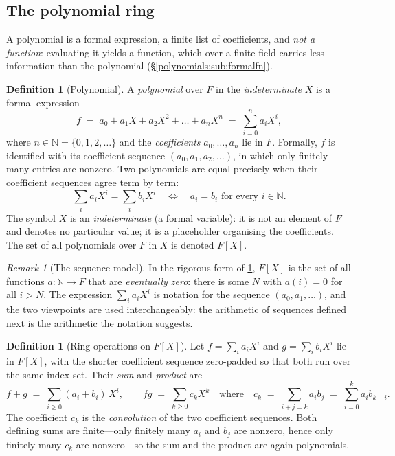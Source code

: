 \documentclass[11pt,a4paper]{article}
\theoremstyle{definition}
\newtheorem{definition}[theorem]{Definition}
\theoremstyle{remark}
\newtheorem{remark}[theorem]{Remark}
\newcommand{\N}{\ensuremath{\mathbb{N}}}
\begin{document}
\subsection{The polynomial ring}\label{polynomials:sub:ring}

A polynomial is a formal expression, a finite list of coefficients, and
\emph{not a function}: evaluating it yields a function, which over a
finite field carries less information than the polynomial
(\S\ref{polynomials:sub:formalfn}).

\begin{definition}[Polynomial]\label{polynomials:def:polynomial}
A \emph{polynomial} over \(F\) in the \emph{indeterminate} \(X\) is a
formal expression
\[
f \;=\; a_0 + a_1 X + a_2 X^2 + \dots + a_n X^n \;=\; \sum_{i=0}^{n} a_i X^i,
\]
where \(n \in \N = \{0,1,2,\dots\}\) and the \emph{coefficients}
\(a_0,\dots,a_n\) lie in \(F\). Formally, \(f\) is identified with its
coefficient sequence \((a_0,a_1,a_2,\dots)\), in which only finitely many
entries are nonzero. Two polynomials are equal precisely when their
coefficient sequences agree term by term:
\[
\sum_i a_i X^i = \sum_i b_i X^i
\quad\Longleftrightarrow\quad
a_i = b_i \text{ for every } i \in \N .
\]
The symbol \(X\) is an \emph{indeterminate} (a formal variable): it is not
an element of \(F\) and denotes no particular value; it is a
placeholder organising the coefficients. The set of all polynomials over
\(F\) in \(X\) is denoted \(F[X]\).
\end{definition}

\begin{remark}[The sequence model]\label{polynomials:rem:sequence-model}
In the rigorous form of \cref{polynomials:def:polynomial}, \(F[X]\) is
the set of all functions \(a\colon \N \to F\) that are \emph{eventually
zero}: there is some \(N\) with \(a(i) = 0\) for all \(i > N\). The
expression \(\sum_i a_i X^i\) is notation for the sequence
\((a_0,a_1,\dots)\), and the two viewpoints are used interchangeably: the
arithmetic of sequences defined next is the arithmetic the notation
suggests.
\end{remark}

\begin{definition}[{Ring operations on \(F[X]\)}]
\label{polynomials:def:operations}
Let \(f = \sum_i a_i X^i\) and \(g = \sum_i b_i X^i\) lie in \(F[X]\),
with the shorter coefficient sequence zero-padded so that both run over
the same index set. Their \emph{sum} and \emph{product} are
\[
f + g \;=\; \sum_{i \ge 0} (a_i + b_i)\, X^i,
\qquad
f g \;=\; \sum_{k \ge 0} c_k X^k
\quad\text{where}\quad
c_k \;=\; \sum_{i+j=k} a_i b_j \;=\; \sum_{i=0}^{k} a_i b_{k-i} .
\]
The coefficient \(c_k\) is the \emph{convolution} of the two coefficient
sequences. Both defining sums are finite---only finitely many \(a_i\) and
\(b_j\) are nonzero, hence only finitely many \(c_k\) are nonzero---so the
sum and the product are again polynomials.
\end{definition}
\end{document}

